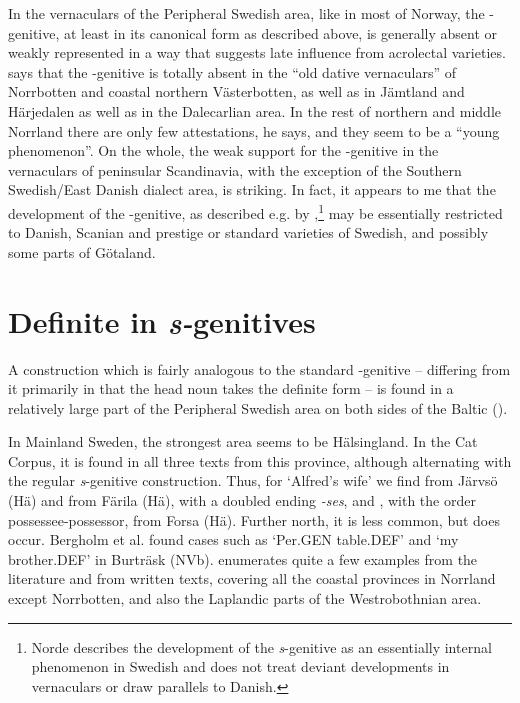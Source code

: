In the vernaculars of the Peripheral Swedish area, like in most of Norway, the -genitive, at least in its canonical form as described above, is generally absent or weakly represented in a way that suggests late influence from acrolectal varieties. \citet[41]{Delsing2003a} says that the -genitive is totally absent in the “old dative vernaculars” of Norrbotten and coastal northern Västerbotten, as well as in Jämtland and Härjedalen as well as in the Dalecarlian area. In the rest of northern and middle Norrland there are only few attestations, he says, and they seem to be a “young phenomenon”. On the whole, the weak support for the -genitive in the vernaculars of peninsular Scandinavia, with the exception of the Southern Swedish/East Danish dialect area, is striking. In fact, it appears to me that the development of the -genitive, as described e.g. by \citet{Norde1997},\footnote{ Norde describes the development of the \textit{s}{}-genitive as an essentially internal phenomenon in Swedish and does not treat deviant developments in vernaculars or draw parallels to Danish.} may be essentially restricted to Danish, Scanian and prestige or standard varieties of Swedish, and possibly some parts of Götaland. 

\section{Definite in \textit{s-}genitives}
\label{bkm:Ref137614892}

A construction which is fairly analogous to the standard -genitive – differing from it primarily in that the head noun takes the definite form – is found in a relatively large part of the Peripheral Swedish area on both sides of the Baltic (\citet[27]{Delsing2003a}).

In Mainland Sweden, the strongest area seems to be Hälsingland. In the Cat Corpus, it is found in all three texts from this province, although alternating with the regular \textit{s}{}-genitive construction. Thus, for ‘Alfred’s wife’ we find  from Järvsö (Hä) and  from Färila (Hä), with a doubled ending\textit{ {}-ses}, and , with the order possessee-possessor, from Forsa (Hä). Further north, it is less common, but does occur.  Bergholm et al. found cases such as ‘Per.GEN table.DEF’ and  ‘my brother.DEF’ in Burträsk (NVb). \citet[27]{Delsing2003a} enumerates quite a few examples from the literature and from written texts, covering all the coastal provinces in Norrland except Norrbotten, and also the Laplandic parts of the Westrobothnian area. 

